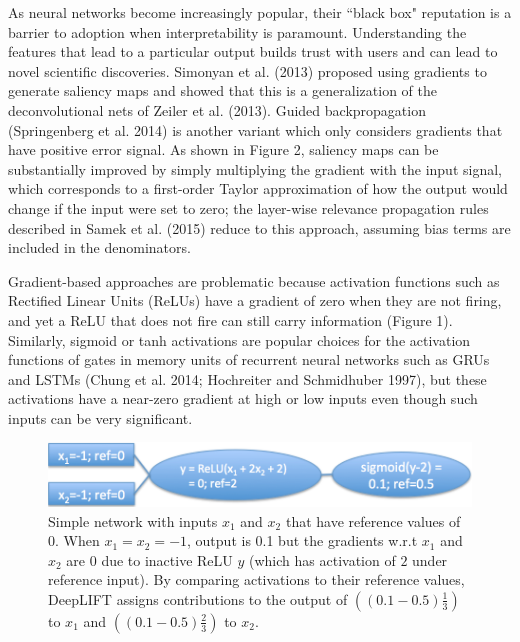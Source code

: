 \documentclass{article}
\begin{document}
As neural networks become increasingly popular, their ``black box" reputation is a barrier to adoption when interpretability is paramount. Understanding the features that lead to a particular output builds trust with users and can lead to novel scientific discoveries. Simonyan et al. (2013) proposed using gradients to generate saliency maps and showed that this is a generalization of the deconvolutional nets of Zeiler et al. (2013). Guided backpropagation (Springenberg et al. 2014) is another variant which only considers gradients that have positive error signal. As shown in Figure 2, saliency maps can be substantially improved by simply multiplying the gradient with the input signal, which corresponds to a first-order Taylor approximation of how the output would change if the input were set to zero; the layer-wise relevance propagation rules described in Samek et al. (2015) reduce to this approach, assuming bias terms are included in the denominators.

Gradient-based approaches are problematic because activation functions such as Rectified Linear Units (ReLUs) have a gradient of zero when they are not firing, and yet a ReLU that does not fire can still carry information (Figure 1). Similarly, sigmoid or tanh activations are popular choices for the activation functions of gates in memory units of recurrent neural networks such as GRUs and LSTMs (Chung et al. 2014; Hochreiter and Schmidhuber 1997), but these activations have a near-zero gradient at high or low inputs even though such inputs can be very significant.

\begin{figure}[!ht]
\vspace{-5px}
\begin{center}
\includegraphics[scale=0.5]{SimpleExample.png}
\caption{Simple network with inputs $x_1$ and $x_2$ that have reference values of 0. When $x_1 = x_2 = -1$, output is 0.1 but the gradients w.r.t $x_1$ and $x_2$ are 0 due to inactive ReLU $y$ (which has activation of $2$ under reference input). By comparing activations to their reference values, DeepLIFT assigns contributions to the output of $\left((0.1-0.5)\frac{1}{3}\right)$ to $x_1$ and $\left((0.1-0.5)\frac{2}{3}\right)$ to $x_2$.}
\end{center}
\vspace{-10px}
\end{figure}
\end{document}
